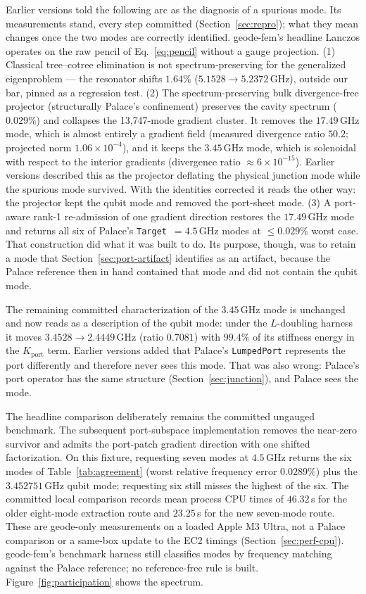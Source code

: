 \documentclass{anvil-paper}
\begin{document}
Earlier versions told the following arc as the diagnosis of a spurious
mode. Its measurements stand, every step committed
(Section~\ref{sec:repro}); what they mean changes once the two modes are
correctly identified. geode-fem's headline Lanczos operates on the raw
pencil of Eq.~\ref{eq:pencil} without a gauge projection. (1) Classical
tree--cotree elimination
\citep{albanese1988solution,manges1995generalized} is not
spectrum-preserving for the generalized eigenproblem --- the resonator
shifts $1.64\%$ ($5.1528 \to 5.2372$\,GHz), outside our bar, pinned as a
regression test. (2) The spectrum-preserving bulk divergence-free
projector (structurally Palace's confinement) preserves the cavity
spectrum ($0.029\%$) and collapses the 13{,}747-mode gradient cluster.
It removes the $17.49$\,GHz mode, which is almost entirely a gradient
field (measured divergence ratio $50.2$; projected norm
$1.06\times10^{-4}$), and it keeps the $3.45$\,GHz mode, which is
solenoidal with respect to the interior gradients (divergence ratio
${\approx}6\times10^{-15}$). Earlier versions described this as the
projector deflating the physical junction mode while the spurious mode
survived. With the identities corrected it reads the other way: the
projector kept the qubit mode and removed the port-sheet mode. (3) A
port-aware rank-1 re-admission of one gradient direction restores the
$17.49$\,GHz mode and returns all six of Palace's
\texttt{Target}~$= 4.5$\,GHz modes at $\leq 0.029\%$ worst case. That
construction did what it was built to do. Its purpose, though, was to
retain a mode that Section~\ref{sec:port-artifact} identifies as an
artifact, because the Palace reference then in hand contained that mode
and did not contain the qubit mode.

The remaining committed characterization of the $3.45$\,GHz mode is
unchanged and now reads as a description of the qubit mode: under the
$L$-doubling harness it moves $3.4528 \to 2.4449$\,GHz (ratio $0.7081$)
with $99.4\%$ of its stiffness energy in the $K_{\mathrm{port}}$ term.
Earlier versions added that Palace's \texttt{LumpedPort} represents the
port differently and therefore never sees this mode. That was also
wrong: Palace's port operator has the same structure
(Section~\ref{sec:junction}), and Palace sees the mode.

The headline comparison deliberately remains the committed ungauged
benchmark. The subsequent port-subspace implementation removes the
near-zero survivor and admits the port-patch gradient direction with one shifted
factorization. On this fixture, requesting seven modes at $4.5$\,GHz
returns the six modes of Table~\ref{tab:agreement} (worst relative
frequency error $0.0289\%$) plus the $3.452751$\,GHz qubit mode;
requesting six still misses the highest of the six. The committed local
comparison records mean process CPU times of $46.32$\,s for the older
eight-mode extraction route and $23.25$\,s for the new seven-mode route.
These are geode-only measurements on a loaded Apple M3 Ultra, not a
Palace comparison or a same-box update to the EC2 timings
(Section~\ref{sec:perf-cpu}). geode-fem's benchmark harness still
classifies modes by frequency matching against the Palace reference; no
reference-free rule is built. Figure~\ref{fig:participation} shows the
spectrum.
\end{document}
